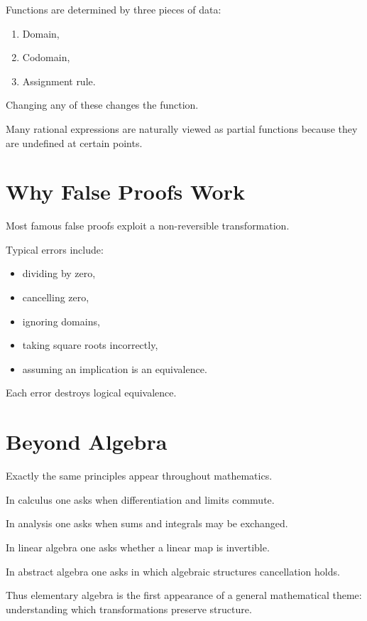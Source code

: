 \documentclass{essay}
\begin{document}
Functions are determined by three pieces of data:

\begin{enumerate}
  \item Domain,
  \item Codomain,
  \item Assignment rule.
\end{enumerate}

Changing any of these changes the function.

Many rational expressions are naturally viewed as partial functions because
they are undefined at certain points.

\section{Why False Proofs Work}

Most famous false proofs exploit a non-reversible transformation.

Typical errors include:

\begin{itemize}
  \item dividing by zero,
  \item cancelling zero,
  \item ignoring domains,
  \item taking square roots incorrectly,
  \item assuming an implication is an equivalence.
\end{itemize}

Each error destroys logical equivalence.

\section{Beyond Algebra}

Exactly the same principles appear throughout mathematics.

In calculus one asks when differentiation and limits commute.

In analysis one asks when sums and integrals may be exchanged.

In linear algebra one asks whether a linear map is invertible.

In abstract algebra one asks in which algebraic structures cancellation holds.

Thus elementary algebra is the first appearance of a general mathematical
theme: understanding which transformations preserve structure.
\end{document}
